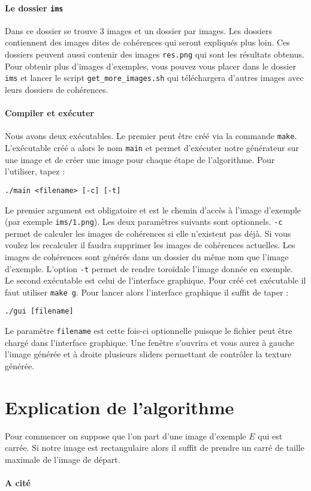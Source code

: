 \documentclass[12pt]{article}
\begin{document}
\paragraph{Le dossier \texttt{ims}}
Dans ce dossier se trouve 3 images et un dossier par images. Les dossiers contiennent des images dites de cohérences qui seront expliqués plus loin. Ces dossiers peuvent aussi contenir des images \verb|res.png| qui sont les résultats obtenus. Pour obtenir plus d'images d'exemples, vous pouvez vous placer dans le dossier \verb|ims| et lancer le script \verb|get_more_images.sh| qui téléchargera d'autres images avec leurs dossiers de cohérences.

\paragraph{Compiler et exécuter}
Nous avons deux exécutables. Le premier peut être créé via la commande \verb|make|. L'exécutable créé a alors le nom \verb|main| et permet d'exécuter notre générateur sur une image et de créer une image pour chaque étape de l'algorithme. Pour l'utiliser, tapez :
\begin{center}
	\texttt{./main <filename> [-c] [-t]}
\end{center}
Le premier argument est obligatoire et est le chemin d'accès à l'image d'exemple (par exemple \verb|ims/1.png|). Les deux paramètres suivants sont optionnels. \verb|-c| permet de calculer les images de cohérences si elle n'existent pas déjà. Si vous voulez les recalculer il faudra supprimer les images de cohérences actuelles. Les images de cohérences sont générés dans un dossier du même nom que l'image d'exemple. L'option \verb|-t| permet de rendre toroïdale l'image donnée en exemple. \\
Le second exécutable est celui de l'interface graphique. Pour créé cet exécutable il faut utiliser \verb|make g|. Pour lancer alors l'interface graphique il suffit de taper :
\begin{center}
	\verb|./gui [filename]|
\end{center}
Le paramètre \verb|filename| est cette fois-ci optionnelle puisque le fichier peut être chargé dans l'interface graphique. Une fenêtre s'ouvrira et vous aurez à gauche l'image générée et à droite plusieurs sliders permettant de contrôler la texture générée.

\section{Explication de l'algorithme}

Pour commencer on suppose que l'on part d'une image d'exemple $E$ qui est carrée. Si notre image est rectangulaire alors il suffit de prendre un carré de taille maximale de l'image de départ.

\paragraph{A cité}
\cite{Ary++}

\appendix



\end{document}
